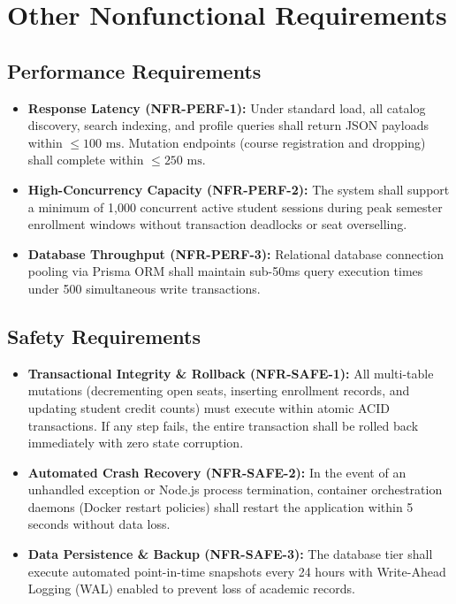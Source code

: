 \documentclass[a4paper,12pt]{article}
\begin{document}
\newpage
\section{Other Nonfunctional Requirements}

\subsection{Performance Requirements}
\begin{itemize}[leftmargin=1.2cm]
    \item \textbf{Response Latency (NFR-PERF-1):} Under standard load, all catalog discovery, search indexing, and profile queries shall return JSON payloads within $\le 100\text{ ms}$. Mutation endpoints (course registration and dropping) shall complete within $\le 250\text{ ms}$.
    \item \textbf{High-Concurrency Capacity (NFR-PERF-2):} The system shall support a minimum of 1,000 concurrent active student sessions during peak semester enrollment windows without transaction deadlocks or seat overselling.
    \item \textbf{Database Throughput (NFR-PERF-3):} Relational database connection pooling via Prisma ORM shall maintain sub-50ms query execution times under 500 simultaneous write transactions.
\end{itemize}

\subsection{Safety Requirements}
\begin{itemize}[leftmargin=1.2cm]
    \item \textbf{Transactional Integrity \& Rollback (NFR-SAFE-1):} All multi-table mutations (decrementing open seats, inserting enrollment records, and updating student credit counts) must execute within atomic ACID transactions. If any step fails, the entire transaction shall be rolled back immediately with zero state corruption.
    \item \textbf{Automated Crash Recovery (NFR-SAFE-2):} In the event of an unhandled exception or Node.js process termination, container orchestration daemons (Docker restart policies) shall restart the application within 5 seconds without data loss.
    \item \textbf{Data Persistence \& Backup (NFR-SAFE-3):} The database tier shall execute automated point-in-time snapshots every 24 hours with Write-Ahead Logging (WAL) enabled to prevent loss of academic records.
\end{itemize}
\end{document}
